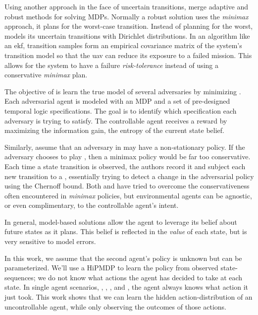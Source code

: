     Using another approach in the face of uncertain transitions, \cite{bertuccelli2012robust} merge adaptive and robust
    methods for solving \acp{MDP}. Normally a robust solution uses the \textit{minimax} approach, it plans for the
    worst-case transition. Instead of planning for the worst,  models its uncertain transitions with Dirichlet
    distributions. In an algorithm like an \ac{ekf}, transition samples form an empirical covariance matrix of the
    system's transition model so that the \ac{uav} can reduce its exposure to a failed mission. This allows for the
    system to have a failure \emph{risk-tolerance} instead of using a conservative \emph{minimax} plan.

    The objective of \cite{chinchali2017multi} is learn the true model of several adversaries by minimizing
    . Each adversarial agent is modeled with an \ac{MDP} and a set of
    pre-designed temporal logic specifications. The goal is to identify which specification each adversary is trying to
    satisfy. The controllable agent receives a reward by maximizing the information gain, the entropy of the current
    state belief.

    Similarly, \cite{lim2013reinforcement} assume that an adversary in  may have a non-stationary policy. If
    the adversary chooses to play , then a minimax policy would be far too conservative. Each
    time a state transition is observed, the authors record it and subject each new transition to a
    , essentially trying to detect a change in the adversarial policy using the
    Chernoff bound. Both \cite{lim2013reinforcement} and \cite{bertuccelli2012robust} have tried to overcome the
    conservativeness often encountered in \textit{minimax} policies, but environmental agents can be agnostic, or even
    complimentary, to the controllable agent's intent.

    In general, model-based solutions allow the agent to leverage its belief about future states as it plans. This
    belief is reflected in the \textit{value} of each state, but is very sensitive to model errors.

    In this work, we assume that the second agent's policy is unknown but can be parameterized. We'll use a \ac{HiPMDP}
    to learn the policy from observed state-sequences; we do not know what actions the agent has decided to take at each
    state. In single agent scenarios, \cite{Fu-RSS-14}, \cite{bertuccelli2012robust}, \cite{peters2008reinforcement},
    and \cite{tangkaratt2014model}, the agent always knows what action it just took. This work shows that we can learn
    the hidden action-distribution of an uncontrollable agent, while only observing the outcomes of those actions.


